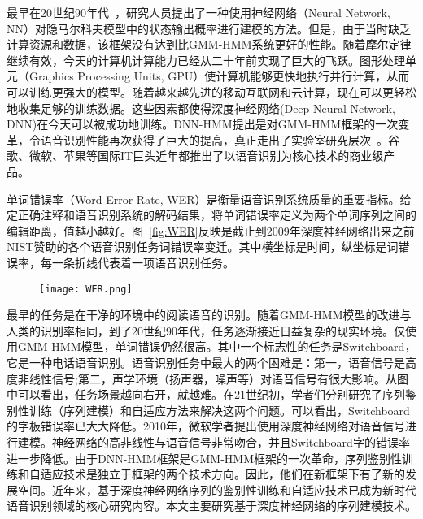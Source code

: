 最早在20世纪90年代~\cite{bourlard1989continuous,bourlard1992cdnn,bourlard2012connectionist}，研究人员提出了一种使用神经网络（Neural Network, NN）对隐马尔科夫模型中的状态输出概率进行建模的方法。但是，由于当时缺乏计算资源和数据，该框架没有达到比GMM-HMM系统更好的性能。随着摩尔定律继续有效，今天的计算机计算能力已经从二十年前实现了巨大的飞跃。图形处理单元（Graphics Processing Units, GPU）使计算机能够更快地执行并行计算，从而可以训练更强大的模型。随着越来越先进的移动互联网和云计算，现在可以更轻松地收集足够的训练数据。这些因素都使得深度神经网络(Deep Neural Network, DNN)在今天可以被成功地训练。DNN-HMM提出是对GMM-HMM框架的一次变革，令语音识别性能再次获得了巨大的提高，真正走出了实验室研究层次~\cite{ASRBook-Yu2014,CD-DNN-HMM-dahl2012,DNN4ASR-hinton2012,qian2016very,TDNN-peddinti2015,Deepspeech2-amodei2015,LACE-yu2016,xiong2017microsoft}。谷歌、微软、苹果等国际IT巨头近年都推出了以语音识别为核心技术的商业级产品。


单词错误率（Word Error Rate, WER）是衡量语音识别系统质量的重要指标。给定正确注释和语音识别系统的解码结果，将单词错误率定义为两个单词序列之间的编辑距离，值越小越好。图~\ref{fig:WER}反映是截止到2009年深度神经网络出来之前NIST赞助的各个语音识别任务词错误率变迁。其中横坐标是时间，纵坐标是词错误率，每一条折线代表着一项语音识别任务。
\begin{figure}[ht]
  \centering
    \captionstyle{\centering}
    \centering
    \texttt{[image: WER.png]}
\end{figure}

最早的任务是在干净的环境中的阅读语音的识别。随着GMM-HMM模型的改进与人类的识别率相同，到了20世纪90年代，任务逐渐接近日益复杂的现实环境。仅使用GMM-HMM模型，单词错误仍然很高。其中一个标志性的任务是Switchboard，它是一种电话语音识别。语音识别任务中最大的两个困难是：第一，语音信号是高度非线性信号;第二，声学环境（扬声器，噪声等）对语音信号有很大影响。从图中可以看出，任务场景越向右开，就越难。在21世纪初，学者们分别研究了序列鉴别性训练（序列建模）和自适应方法来解决这两个问题。可以看出，Switchboard的字板错误率已大大降低。2010年，微软学者提出使用深度神经网络对语音信号进行建模。神经网络的高非线性与语音信号非常吻合，并且Switchboard字的错误率进一步降低。由于DNN-HMM框架是GMM-HMM框架的一次革命，序列鉴别性训练和自适应技术是独立于框架的两个技术方向。因此，他们在新框架下有了新的发展空间。近年来，基于深度神经网络序列的鉴别性训练和自适应技术已成为新时代语音识别领域的核心研究内容。本文主要研究基于深度神经网络的序列建模技术。

